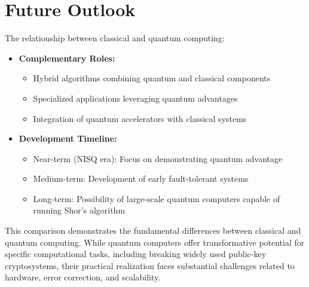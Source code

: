 \section{Future Outlook}\label{sec:outlook_ch4}

The relationship between classical and quantum computing:

\begin{itemize}
    \item \textbf{Complementary Roles:}
    \begin{itemize}
        \item Hybrid algorithms combining quantum and classical components
        \item Specialized applications leveraging quantum advantages
        \item Integration of quantum accelerators with classical systems
    \end{itemize}
    \item \textbf{Development Timeline:}
    \begin{itemize}
        \item Near-term (NISQ era): Focus on demonstrating quantum advantage
        \item Medium-term: Development of early fault-tolerant systems
        \item Long-term: Possibility of large-scale quantum computers capable of running Shor's algorithm
    \end{itemize}
\end{itemize}

This comparison demonstrates the fundamental differences between classical and quantum computing. While quantum computers offer transformative potential for specific computational tasks, including breaking widely used public-key cryptosystems, their practical realization faces substantial challenges related to hardware, error correction, and scalability.